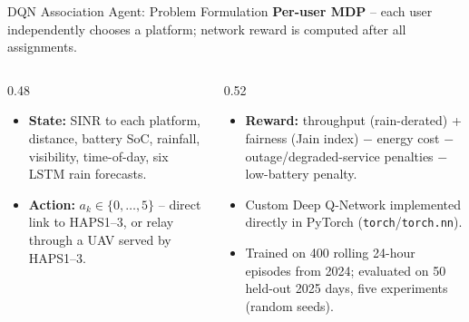 \documentclass[aspectratio=169]{beamer}
\begin{document}
\begin{frame}{DQN Association Agent: Problem Formulation}
\footnotesize
\textbf{Per-user MDP} -- each user independently chooses a platform; network
reward is computed after all assignments.
\vspace{2mm}

\begin{columns}[T]
\begin{column}{0.48\textwidth}
\begin{itemize}\setlength{\itemsep}{3pt}
  \item \textbf{State:} SINR to each platform, distance, battery SoC,
        rainfall, visibility, time-of-day, six LSTM rain forecasts.
  \item \textbf{Action:} $a_k \in \{0,\dots,5\}$ -- direct link to
        HAPS1--3, or relay through a UAV served by HAPS1--3.
\end{itemize}
\end{column}
\begin{column}{0.52\textwidth}
\begin{itemize}\setlength{\itemsep}{3pt}
  \item \textbf{Reward:} throughput (rain-derated) + fairness (Jain
        index) $-$ energy cost $-$ outage/degraded-service penalties
        $-$ low-battery penalty.
\end{itemize}
\vspace{2mm}
\begin{itemize}\setlength{\itemsep}{3pt}
  \item Custom Deep Q-Network implemented directly in PyTorch
        (\texttt{torch}/\texttt{torch.nn}).
  \item Trained on 400 rolling 24-hour episodes from 2024; evaluated on
        50 held-out 2025 days, five experiments (random seeds).
\end{itemize}
\end{column}
\end{columns}
\end{frame}
\end{document}
